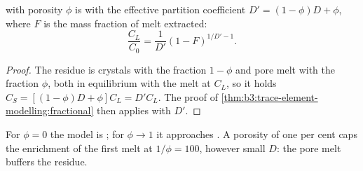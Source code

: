 \begin{proposition}\label{prop:b3:trace-element-modelling:dynamic}
 with porosity $\phi$ is  with the effective
partition coefficient $D' = (1 - \phi)D + \phi$, where $F$ is the mass
fraction of melt extracted:
\[
\frac{C_L}{C_0} = \frac{1}{D'}(1 - F)^{1/D' - 1}.
\]
\end{proposition}

\begin{proof}
The residue is crystals with the fraction $1 - \phi$ and pore melt with the
fraction $\phi$, both in equilibrium with the melt at $C_L$, so it holds
$C_S = [(1 - \phi)D + \phi]C_L = D'C_L$. The proof of
\cref{thm:b3:trace-element-modelling:fractional} then applies with $D'$.
\end{proof}

For $\phi = 0$ the model is ; for $\phi \to 1$ it
approaches . A porosity of one per cent caps the enrichment of
the first melt at $1/\phi = 100$, however small $D$: the pore melt buffers
the residue.

